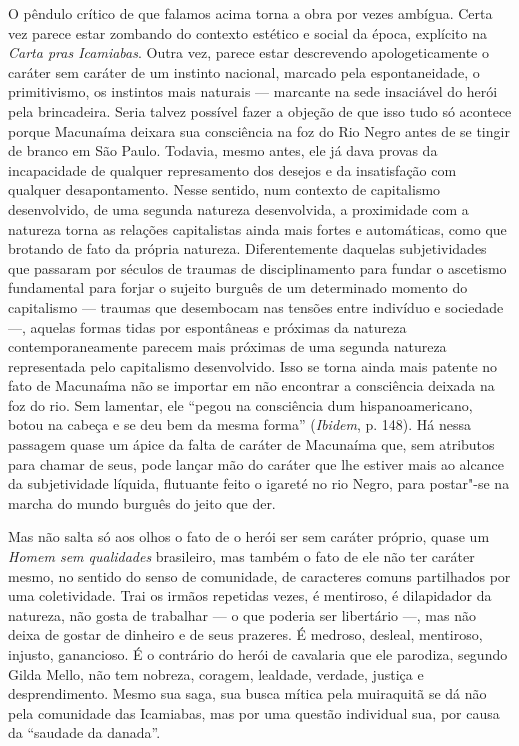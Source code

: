O pêndulo crítico de que falamos acima torna a obra por vezes ambígua.
Certa vez parece estar zombando do contexto estético e social da época,
explícito na \emph{Carta pras Icamiabas}. Outra vez, parece estar
descrevendo apologeticamente o caráter sem caráter de um instinto
nacional, marcado pela espontaneidade, o primitivismo, os instintos mais
naturais --- marcante na sede insaciável do herói pela brincadeira. Seria
talvez possível fazer a objeção de que isso tudo só acontece porque
Macunaíma deixara sua consciência na foz do Rio Negro antes de se tingir
de branco em São Paulo. Todavia, mesmo antes, ele já dava provas da
incapacidade de qualquer represamento dos desejos e da insatisfação com
qualquer desapontamento. Nesse sentido, num contexto de capitalismo
desenvolvido, de uma segunda natureza desenvolvida, a proximidade com a
natureza torna as relações capitalistas ainda mais fortes e automáticas,
como que brotando de fato da própria natureza. Diferentemente daquelas
subjetividades que passaram por séculos de traumas de disciplinamento
para fundar o ascetismo fundamental para forjar o sujeito burguês de um
determinado momento do capitalismo --- traumas que desembocam nas tensões
entre indivíduo e sociedade ---, aquelas formas tidas por espontâneas e
próximas da natureza contemporaneamente parecem mais próximas de uma
segunda natureza representada pelo capitalismo desenvolvido. Isso se
torna ainda mais patente no fato de Macunaíma não se importar em não
encontrar a consciência deixada na foz do rio. Sem lamentar, ele ``pegou
na consciência dum hispanoamericano, botou na cabeça e se deu bem da
mesma forma'' (\emph{Ibidem}, p. 148). Há nessa passagem quase um ápice
da falta de caráter de Macunaíma que, sem atributos para chamar de seus,
pode lançar mão do caráter que lhe estiver mais ao alcance da
subjetividade líquida, flutuante feito o igareté no rio Negro, para
postar"-se na marcha do mundo burguês do jeito que der.

Mas não salta só aos olhos o fato de o herói ser sem caráter próprio,
quase um \emph{Homem sem qualidades} brasileiro, mas também o fato de
ele não ter caráter mesmo, no sentido do senso de comunidade, de
caracteres comuns partilhados por uma coletividade. Trai os irmãos
repetidas vezes, é mentiroso, é dilapidador da natureza, não gosta de
trabalhar --- o que poderia ser libertário ---, mas não deixa de gostar de
dinheiro e de seus prazeres. É medroso, desleal, mentiroso, injusto,
ganancioso. É o contrário do herói de cavalaria que ele parodiza,
segundo Gilda Mello, não tem nobreza, coragem, lealdade, verdade,
justiça e desprendimento. Mesmo sua saga, sua busca mítica pela
muiraquitã se dá não pela comunidade das Icamiabas, mas por uma questão
individual sua, por causa da ``saudade da danada''.

